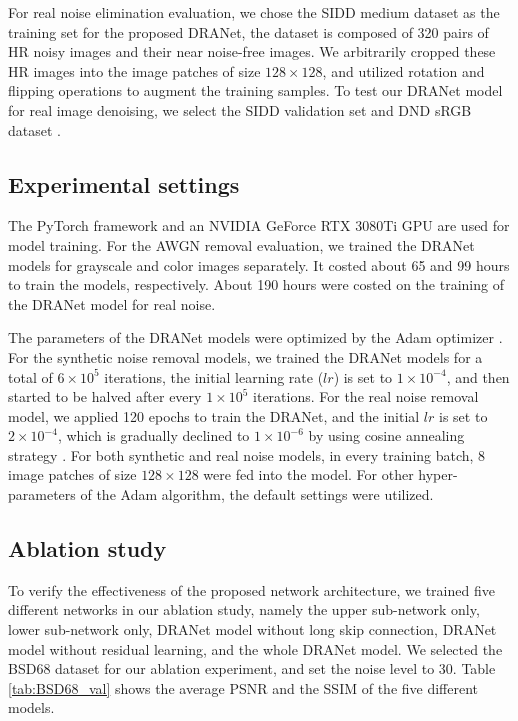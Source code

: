 \documentclass[3p,times]{elsarticle}
\begin{document}
For real noise elimination evaluation, we chose the SIDD medium dataset \cite{Abdelhamed2018} as the training set for the proposed DRANet, the dataset is composed of 320 pairs of HR noisy images and their near noise-free images. We arbitrarily cropped these HR images into the image patches of size $128 \times 128$, and utilized rotation and flipping operations to augment the training samples. To test our DRANet model for real image denoising, we select the SIDD validation set \cite{Abdelhamed2018} and DND sRGB dataset \cite{Plotz2017}.

\subsection{Experimental settings}
The PyTorch framework and an NVIDIA GeForce RTX 3080Ti GPU are used for model training. For the AWGN removal evaluation, we trained the DRANet models for grayscale and color images separately. It costed about 65 and 99 hours to train the models, respectively. About 190 hours were costed on the training of the DRANet model for real noise.

The parameters of the DRANet models were optimized by the Adam optimizer \cite{Kingma2014}. For the synthetic noise removal models, we trained the DRANet models for a total of $6\times10^{5}$ iterations, the initial learning rate ($lr$) is set to $1\times10^{-4}$, and then started to be halved after every $1\times10^{5}$ iterations. For the real noise removal model, we applied 120 epochs to train the DRANet, and the initial $lr$ is set to $2\times10^{-4}$, which is gradually declined to $1\times10^{-6}$ by using cosine annealing strategy \cite{Loshchilov2017}. For both synthetic and real noise models, in every training batch, 8 image patches of size $128 \times 128$ were fed into the model. For other hyper-parameters of the Adam algorithm, the default settings were utilized.

\subsection{Ablation study}
To verify the effectiveness of the proposed network architecture, we trained five different networks in our ablation study, namely the upper sub-network only, lower sub-network only, DRANet model without long skip connection, DRANet model without residual learning, and the whole DRANet model. We selected the BSD68 dataset \cite{Roth2005} for our ablation experiment, and set the noise level to 30. Table \ref{tab:BSD68_val} shows the average PSNR and the SSIM \cite{Wang2004} of the five different models.
\end{document}
